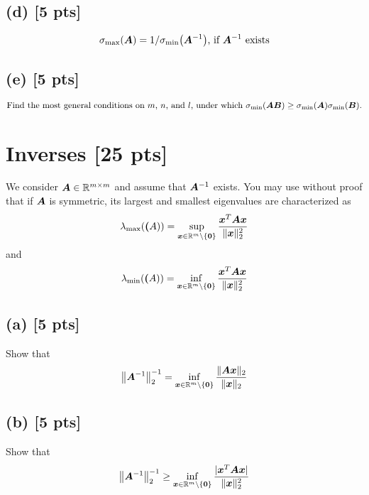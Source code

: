 \documentclass[twoside,10pt]{article}
\begin{document}
\subsection*{(d) [5 pts]}
  \begin{equation*}
    \sigma_{\mathrm{max}}\left(\mtx{A}\right) = 1 / \sigma_{\mathrm{min}}\left(\mtx{A}^{-1}\right)\text{, if $\mtx{A}^{-1}$ exists}
  \end{equation*}
\subsection*{(e) [5 pts]}
  \begin{equation*}
    \text{Find the most general conditions on $m$, $n$, and $l$, under which } \sigma_{\mathrm{min}}\left(\mtx{A}\mtx{B}\right) \geq \sigma_{\mathrm{min}}\left(\mtx{A}\right) \sigma_{\mathrm{min}}\left(\mtx{B}\right).
  \end{equation*}

\section{Inverses [25 pts]}
We consider $\bm{A} \in \mathbb{R}^{m \times m}$ and assume that $\bm{A}^{-1}$ exists. 
You may use without proof that if $\bm{A}$ is symmetric, its largest and smallest eigenvalues are characterized as 
\begin{equation*}
   \lambda_{\mathrm{max}}\left(\mtx(A)\right) = \sup \limits_{\vct{x} \in \R^m \setminus \{\vct{0}\}} \frac{\vct{x}^T \mtx{A}\vct{x}}{\|\vct{x}\|_2^2}
\end{equation*}
and 
\begin{equation*}
   \lambda_{\mathrm{min}}\left(\mtx(A)\right) = \inf \limits_{\vct{x} \in \R^m \setminus \{\vct{0}\}} \frac{\vct{x}^T \mtx{A}\vct{x}}{\|\vct{x}\|_2^2}
\end{equation*}


\subsection*{(a) [5 pts]}
Show that 
\begin{equation}
  \left\|\mtx{A}^{-1}\right\|_2^{-1} = \inf \limits_{\vct{x} \in \R^m \setminus \{\vct{0}\}} \frac{\|\mtx{A}\vct{x}\|_2}{\|\vct{x}\|_2}
\end{equation}

\subsection*{(b) [5 pts]}
Show that 
\begin{equation}
  \left\|\mtx{A}^{-1}\right\|_2^{-1} \geq \inf \limits_{\vct{x} \in \R^m \setminus \{\vct{0}\}} \frac{|\vct{x}^T \mtx{A}\vct{x}|}{\|\vct{x}\|_2^2}
\end{equation}
\end{document}
